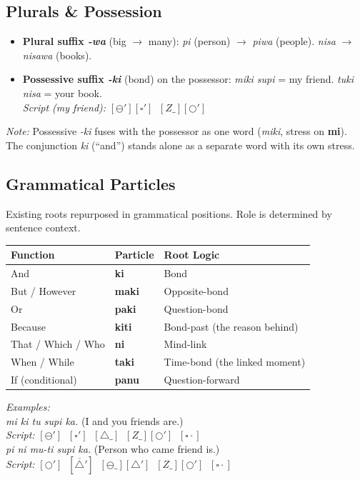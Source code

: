\documentclass[12pt, a4paper]{article}
\begin{document}
\subsection{Plurals \& Possession}
\begin{itemize}
    \item \textbf{Plural suffix \textit{-wa}} (big $\rightarrow$ many): \quad \textit{pi} (person) $\rightarrow$ \textit{piwa} (people). \quad \textit{nisa} $\rightarrow$ \textit{nisawa} (books).
    \item \textbf{Possessive suffix \textit{-ki}} (bond) on the possessor: \quad \textit{miki supi} = my friend. \quad \textit{tuki nisa} = your book. \\
    \textit{Script (my friend):} $[\ominus'][\square'] \;\; [Z\_][\bigcirc']$
\end{itemize}
\textit{Note:} Possessive \textit{-ki} fuses with the possessor as one word (\textit{miki}, stress on \textbf{mi}). The conjunction \textit{ki} (``and'') stands alone as a separate word with its own stress.

\subsection{Grammatical Particles}
Existing roots repurposed in grammatical positions. Role is determined by sentence context.

\vspace{0.5em}
\begin{tabular}{@{}lll@{}}
\toprule
\textbf{Function} & \textbf{Particle} & \textbf{Root Logic} \\ \midrule
And & \textbf{ki} & Bond \\
But / However & \textbf{maki} & Opposite-bond \\
Or & \textbf{paki} & Question-bond \\
Because & \textbf{kiti} & Bond-past (the reason behind) \\
That / Which / Who & \textbf{ni} & Mind-link \\
When / While & \textbf{taki} & Time-bond (the linked moment) \\
If (conditional) & \textbf{panu} & Question-forward \\
\bottomrule
\end{tabular}

\vspace{0.5em}
\noindent\textit{Examples:} \\
\textit{mi ki tu supi ka.} \quad (I and you friends are.) \\
\textit{Script:} $[\ominus'] \;\; [\square'] \;\; [\triangle\_] \;\; [Z\_][\bigcirc'] \;\; [\square\cdot]$ \\[0.3em]
\textit{pi ni mu-ti supi ka.} \quad (Person who came friend is.) \\
\textit{Script:} $[\bigcirc'] \;\; [\overline{\triangle}'] \;\; [\ominus\_][\triangle'] \;\; [Z\_][\bigcirc'] \;\; [\square\cdot]$
\end{document}
